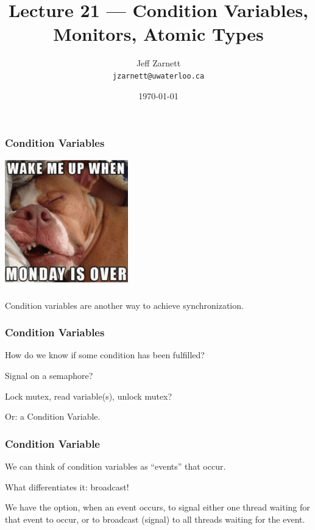 

\title{Lecture 21 --- Condition Variables, Monitors, Atomic Types }

\author{Jeff Zarnett \\ \small \texttt{jzarnett@uwaterloo.ca}}
\date{\today}




\begin{frame}
	\titlepage

\end{frame}


\begin{frame}
	\frametitle{Condition Variables}

	\begin{center}
		\includegraphics[width=0.4\textwidth]{images/monday.png}
	\end{center}

	Condition variables are another way to achieve synchronization.

\end{frame}

\begin{frame}
	\frametitle{Condition Variables}

	How do we know if some condition has been fulfilled?

	Signal on a semaphore?

	Lock mutex, read variable(s), unlock mutex?

	Or: a Condition Variable.

\end{frame}


\begin{frame}
	\frametitle{Condition Variable}

	We can think of condition variables as ``events'' that occur.

	What differentiates it: broadcast!

	We have the option, when an event occurs, to signal either one thread waiting for that event to occur, or to broadcast (signal) to all threads waiting for the event.

\end{frame}

